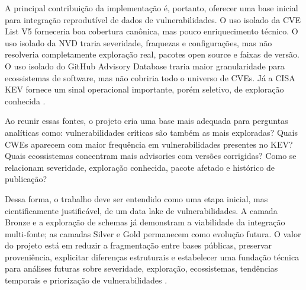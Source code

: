 A principal contribuição da implementação é, portanto, oferecer uma base inicial para integração reprodutível de dados de vulnerabilidades. O uso isolado da CVE List V5 forneceria boa cobertura canônica, mas pouco enriquecimento técnico. O uso isolado da NVD traria severidade, fraquezas e configurações, mas não resolveria completamente exploração real, pacotes open source e faixas de versão. O uso isolado do GitHub Advisory Database traria maior granularidade para ecossistemas de software, mas não cobriria todo o universo de CVEs. Já a CISA KEV fornece um sinal operacional importante, porém seletivo, de exploração conhecida \cite{cve_program_overview,nvd_home,github_advisory_database_docs,cisa_kev_catalog}.

Ao reunir essas fontes, o projeto cria uma base mais adequada para perguntas analíticas como: vulnerabilidades críticas são também as mais exploradas? Quais CWEs aparecem com maior frequência em vulnerabilidades presentes no KEV? Quais ecossistemas concentram mais advisories com versões corrigidas? Como se relacionam severidade, exploração conhecida, pacote afetado e histórico de publicação?

Dessa forma, o trabalho deve ser entendido como uma etapa inicial, mas cientificamente justificável, de um data lake de vulnerabilidades. A camada Bronze e a exploração de schemas já demonstram a viabilidade da integração multi-fonte; as camadas Silver e Gold permanecem como evolução futura. O valor do projeto está em reduzir a fragmentação entre bases públicas, preservar proveniência, explicitar diferenças estruturais e estabelecer uma fundação técnica para análises futuras sobre severidade, exploração, ecossistemas, tendências temporais e priorização de vulnerabilidades \cite{databricks_medallion_architecture,jiang2021_inconsistency,allodi2014_case_control,jacobs2021_epss}.
